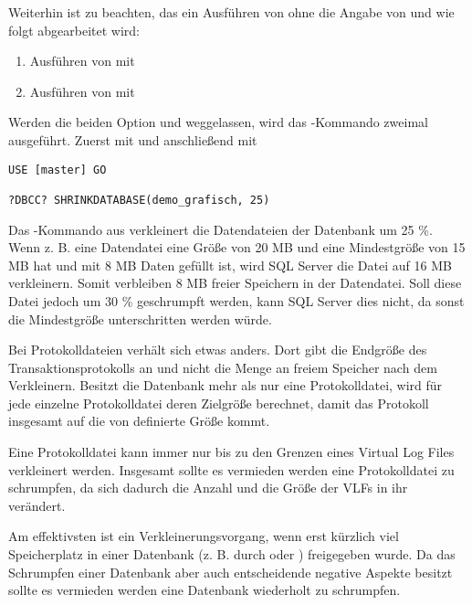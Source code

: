           Weiterhin ist zu beachten, das ein Ausführen von
           ohne die Angabe von
           und  wie folgt
          abgearbeitet wird:
          \begin{enumerate}
            \item Ausführen von  mit
            \item Ausführen von  mit
          \end{enumerate}
          \begin{merke}
            Werden die beiden Option  und
             weggelassen, wird das
            -Kommando zweimal ausgeführt. Zuerst mit
             und anschließend mit
          \end{merke}        
          \begin{lstlisting}[language=ms_sql,caption={Verkleinern einer
          Datenbank},label=admin03_33]
USE [master] GO

?DBCC? SHRINKDATABASE(demo_grafisch, 25)
          \end{lstlisting}          
          Das -Kommando aus 
          verkleinert die Datendateien der Datenbank 
          um 25 \%. Wenn z. B. eine Datendatei eine Größe von 20 MB und
          eine Mindestgröße von 15 MB hat und mit 8 MB Daten gefüllt ist, wird SQL
          Server die Datei auf 16 MB verkleinern. Somit verbleiben 8 MB freier
          Speichern in der Datendatei. Soll diese Datei jedoch um 30 \%
          geschrumpft werden, kann SQL Server dies nicht, da sonst die
          Mindestgröße unterschritten werden würde.
        
          Bei Protokolldateien verhält sich  etwas
          anders. Dort gibt  die Endgröße des
          Transaktionsprotokolls an und nicht die Menge an freiem Speicher nach
          dem Verkleinern. Besitzt die Datenbank mehr als nur eine Protokolldatei,
          wird für jede einzelne Protokolldatei deren Zielgröße berechnet, damit
          das Protokoll insgesamt auf die von 
          definierte Größe kommt.
          \begin{merke}
            Eine Protokolldatei kann immer nur bis zu den Grenzen eines Virtual
            Log Files verkleinert werden. Insgesamt sollte es vermieden werden
            eine Protokolldatei zu schrumpfen, da sich dadurch die Anzahl und die
            Größe der VLFs in ihr verändert.
          \end{merke}
          Am effektivsten ist ein Verkleinerungsvorgang, wenn erst kürzlich viel
          Speicherplatz in einer Datenbank (z. B. durch 
          oder ) freigegeben wurde. Da das Schrumpfen
          einer Datenbank aber auch entscheidende negative Aspekte besitzt sollte
          es vermieden werden eine Datenbank wiederholt zu schrumpfen.
